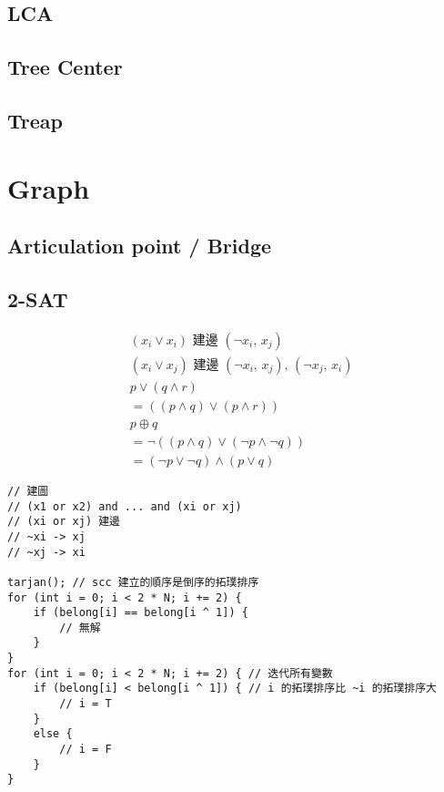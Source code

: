 \documentclass[10pt,oneside]{article}
\begin{document}
\begin{landscape}
\begin{multicols}{2}
\subsection{LCA}


\subsection{Tree Center}


\subsection{Treap}



\section{Graph}

\subsection{Articulation point / Bridge}


\subsection{2-SAT}

\begin{align*}
 &(x_i \lor x_i) \textit{ 建邊 } (\lnot x_i,\, x_j) \\
 &(x_i \lor x_j) \textit{ 建邊 } (\lnot x_i,\, x_j) ,\, (\lnot x_j,\, x_i) \\
&p \lor (q \land r)  \\
&= ((p \land q) \lor (p \land r)) \\
&p \oplus q   \\
&= \lnot ( (p \land q) \lor (\lnot p \land \lnot q))     \\
&= (\lnot p \lor \lnot q) \land (p \lor q)    
\end{align*}

\begin{lstlisting}
// 建圖
// (x1 or x2) and ... and (xi or xj)
// (xi or xj) 建邊
// ~xi -> xj
// ~xj -> xi

tarjan(); // scc 建立的順序是倒序的拓璞排序
for (int i = 0; i < 2 * N; i += 2) {
    if (belong[i] == belong[i ^ 1]) {
        // 無解
    }
}
for (int i = 0; i < 2 * N; i += 2) { // 迭代所有變數
    if (belong[i] < belong[i ^ 1]) { // i 的拓璞排序比 ~i 的拓璞排序大
        // i = T
    }
    else {
        // i = F
    }
}
\end{lstlisting}


\end{multicols}
\end{landscape}
\end{document}
